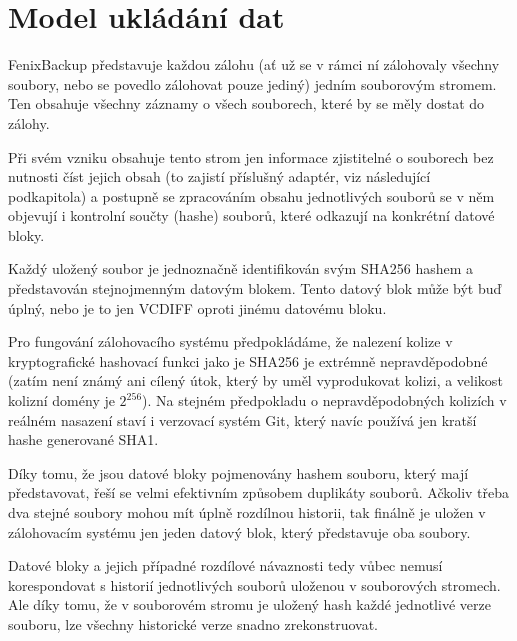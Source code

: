 \section{Model ukládání dat}

FenixBackup představuje každou zálohu (ať už se v rámci ní zálohovaly všechny
soubory, nebo se povedlo zálohovat pouze jediný) jedním souborovým stromem. Ten
obsahuje všechny záznamy o všech souborech, které by se měly dostat do zálohy.

Při svém vzniku obsahuje tento strom jen informace zjistitelné o souborech bez
nutnosti číst jejich obsah (to zajistí příslušný adaptér, viz následující
podkapitola) a postupně se zpracováním obsahu jednotlivých souborů se v něm
objevují i kontrolní součty (hashe) souborů, které odkazují na konkrétní datové
bloky.


Každý uložený soubor je jednoznačně identifikován svým \gls{SHA256} hashem
a představován stejnojmenným datovým blokem. Tento datový blok může být buď
úplný, nebo je to jen \gls{VCDIFF} oproti jinému datovému bloku.

Pro fungování zálohovacího systému předpokládáme, že nalezení kolize v
kryptografické hashovací funkci jako je \gls{SHA256} je extrémně
nepravděpodobné (zatím není známý ani cílený útok, který by uměl vyprodukovat
kolizi, a velikost kolizní domény je $2^{256}$). Na stejném předpokladu
o nepravděpodobných kolizích v reálném nasazení staví i verzovací systém Git,
který navíc používá jen kratší hashe generované \gls{SHA1}.

Díky tomu, že jsou datové bloky pojmenovány hashem souboru, který mají
představovat, řeší se velmi efektivním způsobem duplikáty souborů. Ačkoliv třeba
dva stejné soubory mohou mít úplně rozdílnou historii, tak finálně je uložen
v zálohovacím systému jen jeden datový blok, který představuje oba soubory.

Datové bloky a jejich případné rozdílové návaznosti tedy vůbec nemusí
korespondovat s historií jednotlivých souborů uloženou v souborových stromech.
Ale díky tomu, že v souborovém stromu je uložený hash každé jednotlivé verze
souboru, lze všechny historické verze snadno zrekonstruovat.

